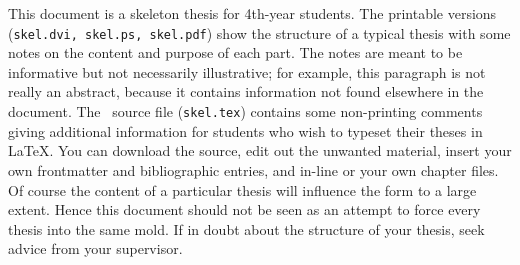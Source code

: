 \documentclass[12pt,openany,a4paper]{book}
\begin{document}
This document is a skeleton thesis for 4th-year students.  The
printable versions (\texttt{skel.dvi, skel.ps, skel.pdf})
show the structure of a typical thesis with some notes on the content
and purpose of each part.  The notes are meant to be informative but
not necessarily illustrative; for example, this paragraph is not
really an abstract, because it contains information not found
elsewhere in the document.  The \LaTeXe\ source file
(\texttt{skel.tex}) contains some non-printing comments giving
additional information for students who wish to typeset their theses
in \LaTeX.  You can download the source, edit out the unwanted
material, insert your own frontmatter and bibliographic entries, and
in-line or \verb++ your own chapter files.  Of course the
content of a particular thesis will influence the form to a large
extent.  Hence this document should not be seen as an attempt to force
every thesis into the same mold.  If in doubt about the structure of
your thesis, seek advice from your supervisor.

\tableofcontents

\listoffigures
{}

\listoftables
{}

% 

\cleardoublepage

\mainmatter


%
%
%
%	
%	
\end{document}
